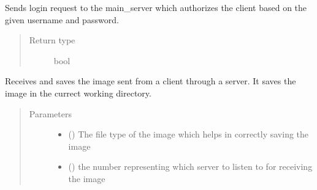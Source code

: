 \documentclass[letterpaper,10pt,english]{sphinxmanual}
\begin{document}

\begin{fulllineitems}
\label{\detokenize{client:client.loGin}}
Sends login request to the main\_server which authorizes the client based on the given username and password.
\begin{quote}\begin{description}
\item[{Return type}] \leavevmode
bool

\end{description}\end{quote}

\end{fulllineitems}


\begin{fulllineitems}
\label{\detokenize{client:client.rec_image}}
Receives and saves the image sent from a client through a server. It saves the image in the currect working directory.
\begin{quote}\begin{description}
\item[{Parameters}] \leavevmode\begin{itemize}
\item {} 
 () \textendash{} The file type of the image which helps in correctly saving the image

\item {} 
 () \textendash{} the number representing which server to listen to for receiving the image

\end{itemize}

\end{description}\end{quote}

\end{fulllineitems}
\end{document}
